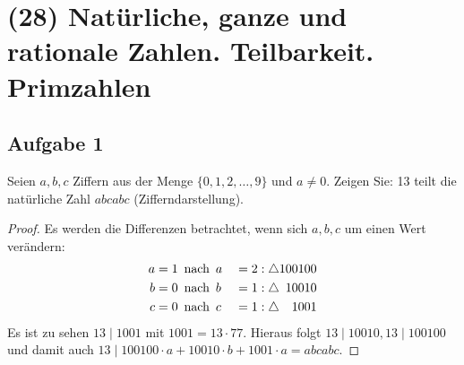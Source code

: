 \section{(28) Natürliche, ganze und rationale Zahlen. Teilbarkeit. Primzahlen}

\subsection{Aufgabe 1}
Seien $a,b,c$ Ziffern aus der Menge $\{0,1,2,\dotsc,9\}$ und $a \neq 0$.
Zeigen Sie: 13 teilt die natürliche Zahl $abcabc$ (Zifferndarstellung).
\begin{proof}
  Es werden die Differenzen betrachtet, wenn sich $a, b, c$ um einen Wert verändern:
  \begin{alignat*}{2}
    a & = 1 \enspace\text{nach}\enspace a &  & = 2 : \triangle 100100            \\
    b & = 0 \enspace\text{nach}\enspace b &  & = 1 : \triangle \hphantom{0}10010 \\
    c & = 0 \enspace\text{nach}\enspace c &  & = 1 : \triangle \hphantom{00}1001
  \end{alignat*}
  Es ist zu sehen $13 \mid 1001$ mit $1001 = 13 \cdot 77$.
  Hieraus folgt $13 \mid 10010, 13 \mid 100100$ und damit auch
  $13 \mid 100100 \cdot a + 10010 \cdot b + 1001 \cdot a = abcabc$.
\end{proof}

